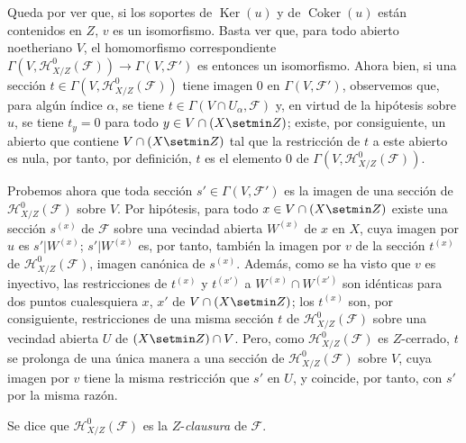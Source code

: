 Queda por ver que, si los soportes de $\operatorname{Ker}(u)$ y de
$\operatorname{Coker}(u)$ están contenidos en $Z$, $v$ es un isomorfismo.
Basta ver que, para todo abierto noetheriano $V$, el homomorfismo
correspondiente
$\Gamma(V,\mathcal H^0_{X/Z}(\mathcal F))
\longrightarrow\Gamma(V,\mathcal F')$
es entonces un isomorfismo. Ahora bien, si una sección
$t\in\Gamma(V,\mathcal H^0_{X/Z}(\mathcal F))$ tiene imagen $0$ en
$\Gamma(V,\mathcal F')$, observemos que, para algún índice $\alpha$, se tiene
$t\in\Gamma(V\cap U_\alpha,\mathcal F)$ y, en virtud de la hipótesis sobre
$u$, se tiene $t_y=0$ para todo $y\in V\cap(X\setmin Z)$; existe, por consiguiente,
un abierto que contiene $V\cap(X\setmin Z)$ tal que la restricción de $t$ a este
abierto es nula, por tanto, por definición, $t$ es el elemento $0$ de
$\Gamma(V,\mathcal H^0_{X/Z}(\mathcal F))$.

Probemos ahora que toda sección $s'\in\Gamma(V,\mathcal F')$ es la imagen de
una sección de $\mathcal H^0_{X/Z}(\mathcal F)$ sobre $V$. Por hipótesis,
para todo $x\in V\cap(X\setmin Z)$ existe una sección $s^{(x)}$ de $\mathcal F$
sobre una vecindad abierta $W^{(x)}$ de $x$ en $X$, cuya imagen por $u$ es
$s'|W^{(x)}$; $s'|W^{(x)}$ es, por tanto, también la imagen por $v$ de la
sección $t^{(x)}$ de $\mathcal H^0_{X/Z}(\mathcal F)$, imagen canónica de
$s^{(x)}$. Además, como se ha visto que $v$ es inyectivo, las restricciones
de $t^{(x)}$ y $t^{(x')}$ a $W^{(x)}\cap W^{(x')}$ son idénticas para dos
puntos cualesquiera $x$, $x'$ de $V\cap(X\setmin Z)$; los $t^{(x)}$ son, por
consiguiente, restricciones de una misma sección $t$ de
$\mathcal H^0_{X/Z}(\mathcal F)$ sobre una vecindad abierta $U$ de
$(X\setmin Z)\cap V$. Pero, como $\mathcal H^0_{X/Z}(\mathcal F)$ es $Z$-cerrado,
$t$ se prolonga de una única manera a una sección de
$\mathcal H^0_{X/Z}(\mathcal F)$ sobre $V$, cuya imagen por $v$ tiene la
misma restricción que $s'$ en $U$, y coincide, por tanto, con $s'$ por la misma
razón.

Se dice que $\mathcal H^0_{X/Z}(\mathcal F)$ es la $Z$-\emph{clausura} de
$\mathcal F$.

